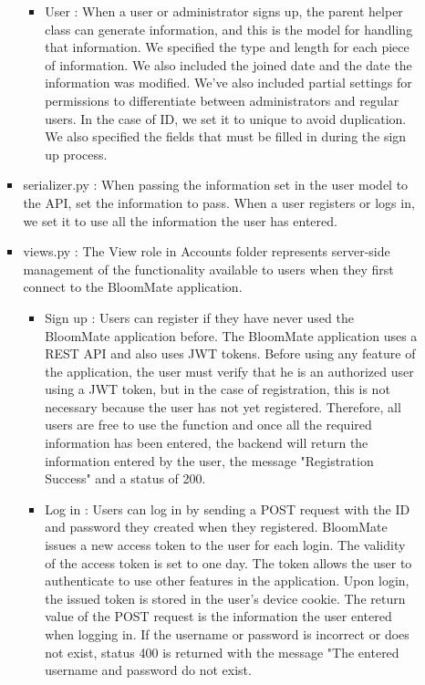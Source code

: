 \documentclass[conference, a4paper]{IEEEtran}
\begin{document}
\begin{enumerate}
\begin{itemize}
\begin{itemize}
\begin{itemize}
                \item User : When a user or administrator signs up, the parent helper class can generate information, and this is the model for handling that information. We specified the type and length for each piece of information. We also included the joined date and the date the information was modified. We've also included partial settings for permissions to differentiate between administrators and regular users. In the case of ID, we set it to unique to avoid duplication. We also specified the fields that must be filled in during the sign up process. \\
            \end{itemize}
            \item serializer.py : When passing the information set in the user model to the API, set the information to pass. When a user registers or logs in, we set it to use all the information the user has entered. \\
            \item views.py : The View role in Accounts folder represents server-side management of the functionality available to users when they first connect to the BloomMate application. 
            \begin{itemize}
                \item Sign up : Users can register if they have never used the BloomMate application before. The BloomMate application uses a REST API and also uses JWT tokens. Before using any feature of the application, the user must verify that he is an authorized user using a JWT token, but in the case of registration, this is not necessary because the user has not yet registered. Therefore, all users are free to use the function and once all the required information has been entered, the backend will return the information entered by the user, the message "Registration Success" and a status of 200. \\
                \item Log in : Users can log in by sending a POST request with the ID and password they created when they registered. BloomMate issues a new access token to the user for each login. The validity of the access token is set to one day. The token allows the user to authenticate to use other features in the application. Upon login, the issued token is stored in the user's device cookie. The return value of the POST request is the information the user entered when logging in. If the username or password is incorrect or does not exist, status 400 is returned with the message "The entered username and password do not exist. \\

\end{itemize}
\end{itemize}
\end{itemize}
\end{enumerate}
\end{document}
